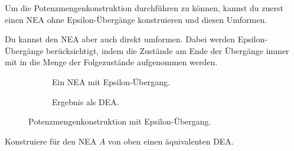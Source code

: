 \documentclass[10pt, a4paper]{scrartcl}
\begin{document}
\begin{aufgabe}
	Um die Potenzmengenkonstruktion durchführen zu können, kannst du zuerst einen NEA ohne Epsilon-Übergänge konstruieren und diesen Umformen.
	
	Du kannst den NEA aber auch direkt umformen. Dabei werden Epsilon-Übergänge berücksichtigt, indem die Zustände am Ende der Übergänge immer mit in die Menge der Folgezustände aufgenommen werden.
	
	\begin{figure}[h]
		\centering
		\begin{subfigure}{.5\textwidth}
		\centering
		  \begin{transitiongraph}[fa]
	  	 \end{transitiongraph}
	  	 \caption{Ein NEA mit Epsilon-Übergang.}
	  	 \label{abb:grah_2}
		\end{subfigure}%
		\begin{subfigure}{.5\textwidth}
		\centering
		  \begin{transitiongraph}[fa]
	  	 \end{transitiongraph}
	  	 \caption{Ergebnis als DEA.}
	  	 \label{abb:grah_3}
		\end{subfigure}
		\caption{Potenzmengenkonstruktion mit Epsilon-Übergang.}
	\end{figure}
	
	Konstruiere für den NEA $A$ von oben einen äquivalenten DEA.
\end{aufgabe}
\end{document}
